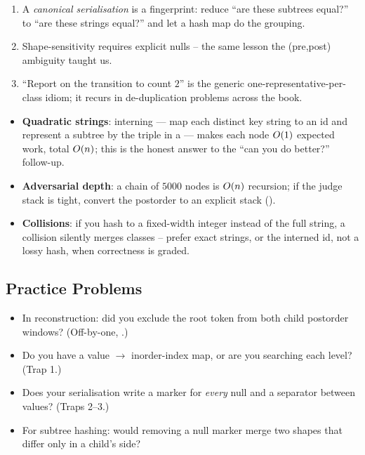 \begin{insightbox}
\begin{enumerate}[nosep, leftmargin=1.6em]
  \item A \emph{canonical serialisation} is a fingerprint: reduce ``are these subtrees
        equal?'' to ``are these strings equal?'' and let a hash map do the grouping.
  \item Shape-sensitivity requires explicit nulls -- the same lesson the (pre,post)
        ambiguity taught us.
  \item ``Report on the transition to count $2$'' is the generic one-representative-per-class
        idiom; it recurs in de-duplication problems across the book.
\end{enumerate}
\end{insightbox}

\begin{hardeningbox}
\begin{itemize}[nosep, leftmargin=1.4em]
  \item \textbf{Quadratic strings}: interning --- map each distinct key string to an
         id and represent a subtree by the triple 
        in a  --- makes each node $O(1)$ expected work, total
        $O(n)$; this is the honest answer to the ``can you do better?'' follow-up.
  \item \textbf{Adversarial depth}: a chain of $5000$ nodes is $O(n)$ recursion; if the
        judge stack is tight, convert the postorder to an explicit stack ().
  \item \textbf{Collisions}: if you hash to a fixed-width integer instead of the full
        string, a collision silently merges classes -- prefer exact strings, or the interned
        id, not a lossy hash, when correctness is graded.
\end{itemize}
\end{hardeningbox}

\subsection{Practice Problems}

\begin{stuckbox}
\begin{itemize}[nosep, leftmargin=1.4em]
  \item In reconstruction: did you exclude the root token from both child postorder
        windows? (Off-by-one, .)
  \item Do you have a value $\to$ inorder-index map, or are you searching each level?
        (Trap 1.)
  \item Does your serialisation write a marker for \emph{every} null and a separator between
        values? (Traps 2--3.)
  \item For subtree hashing: would removing a null marker merge two shapes that differ only
        in a child's side?
\end{itemize}
\end{stuckbox}

